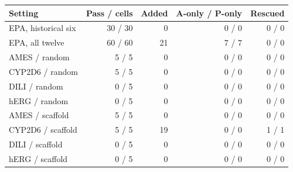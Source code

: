 \begin{tabular}{lrrrr}\toprule
Setting & Pass / cells & Added & A-only / P-only & Rescued \\
\midrule
EPA, historical six & 30 / 30 & 0 & 0 / 0 & 0 / 0 \\
EPA, all twelve & 60 / 60 & 21 & 7 / 7 & 0 / 0 \\
AMES / random & 5 / 5 & 0 & 0 / 0 & 0 / 0 \\
CYP2D6 / random & 5 / 5 & 0 & 0 / 0 & 0 / 0 \\
DILI / random & 0 / 5 & 0 & 0 / 0 & 0 / 0 \\
hERG / random & 0 / 5 & 0 & 0 / 0 & 0 / 0 \\
AMES / scaffold & 5 / 5 & 0 & 0 / 0 & 0 / 0 \\
CYP2D6 / scaffold & 5 / 5 & 19 & 0 / 0 & 1 / 1 \\
DILI / scaffold & 0 / 5 & 0 & 0 / 0 & 0 / 0 \\
hERG / scaffold & 0 / 5 & 0 & 0 / 0 & 0 / 0 \\
\bottomrule\end{tabular}
